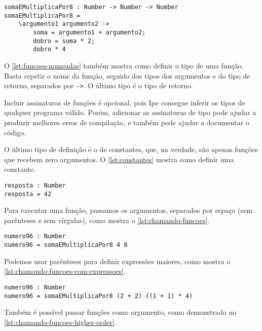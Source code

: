 \begin{lstlisting}[label={lst:funcoes-nomeadas},caption={Exemplo de como definir uma função nomeada}]
somaEMultiplicaPor8 : Number -> Number -> Number
somaEMultiplicaPor8 =
    \argumento1 argumento2 ->
        soma = argumento1 + argumento2;
        dobro = soma * 2;
        dobro * 4
\end{lstlisting}

O \autoref{lst:funcoes-nomeadas} também mostra como definir o tipo de uma função.
Basta repetir o nome da função, seguido dos tipos dos argumentos e do tipo de retorno,
separados por \texttt{->}. O último tipo é o tipo de retorno.

Incluir assinaturas de funções é opcional, pois Ipe consegue inferir os tipos de
qualquer programa válido. Porém, adicionar as assinaturas de tipo pode ajudar a
produzir melhores erros de compilação, e também pode ajudar a documentar o código.

O último tipo de definição é o de constantes, que, na verdade, são apenas funções
que recebem zero argumentos. O \autoref{lst:constantes} mostra como definir uma
constante.

\begin{lstlisting}[label={lst:constantes},caption={Exemplo de como definir uma constante}]
resposta : Number
resposta = 42
\end{lstlisting}

Para executar uma função, passamos os argumentos, separados por espaço (sem parênteses
e sem vírgulas), como mostra o \autoref{lst:chamando-funcoes}.

\begin{lstlisting}[label={lst:chamando-funcoes},caption={Exemplo de como chamar uma função}]
numero96 : Number
numero96 = somaEMultiplicaPor8 4 8
\end{lstlisting}

Podemos usar parênteses para definir expressões maiores, como mostra o
\autoref{lst:chamando-funcoes-com-expressoes}.

\begin{lstlisting}[label={lst:chamando-funcoes-com-expressoes},caption={Exemplo de como chamar uma função com uma expressões maiores}]
numero96 : Number
numero96 = somaEMultiplicaPor8 (2 + 2) ((1 + 1) * 4)
\end{lstlisting}

Também é possível passar funções como argumento, como demonstrado no \autoref{lst:chamando-funcoes-higher-order}.

